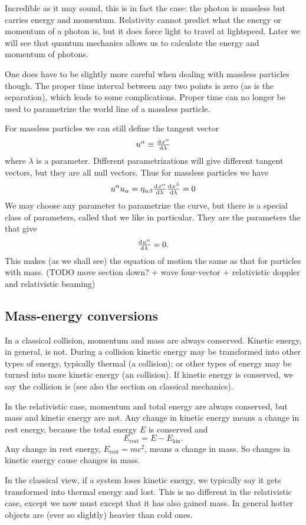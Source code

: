 Incredible as it may sound, this is in fact the case: the photon is massless but carries energy and momentum. Relativity cannot predict what the energy or momentum of a photon is, but it does force light to travel at lightspeed. Later we will see that quantum mechanics allows us to calculate the energy and momentum of photons.

One does have to be slightly more careful when dealing with massless particles though. The proper time interval between any two points is zero (as is the separation), which leads to some complications. Proper time can no longer be used to parametrize the world line of a massless particle.

For massless particles we can still define the tangent vector
\[ u^\alpha \equiv \od{x^\alpha}{\lambda} \]
where $\lambda$ is a parameter.
Different parametrizations will give different tangent vectors, but they are all null vectors. Thus for massless particles we have 
\[ u^\alpha u_\alpha = \eta_{\alpha\beta}\od{x^\alpha}{\lambda}\od{x^\beta}{\lambda} = 0 \]
We may choose any parameter to parametrize the curve, but there is a special class of parameters, called  that we like in particular. They are the parameters the that give
\[ \od{u^\alpha}{\lambda} = 0. \]
This makes (as we shall see) the equation of motion the same as that for particles with mass. (TODO move section down? + wave four-vector + relativistic doppler and relativistic beaming)
\subsection{Mass-energy conversions}
In a classical collision, momentum and mass are always conserved. Kinetic energy, in general, is not. During a collision kinetic energy may be transformed into other types of energy, typically thermal (a  collision); or other types of energy may be turned into more kinetic energy (an  collision). If kinetic energy is conserved, we say the collision is  (see also the section on classical mechanics).

In the relativistic case, momentum and total energy are always conserved, but mass and kinetic energy are not. Any change in kinetic energy means a change in rest energy, because the total energy $E$ is conserved and
\[ E_\text{rest} = E - E_\text{kin}. \]
Any change in rest energy, $E_\text{rest} = mc^2$, means a change in mass. So changes in kinetic energy cause changes in mass.

In the classical view, if a system loses kinetic energy, we typically say it gets transformed into thermal energy and lost. This is no different in the relativistic case, except we now must except that it has also gained mass. In general hotter objects are (ever so slightly) heavier than cold ones.

